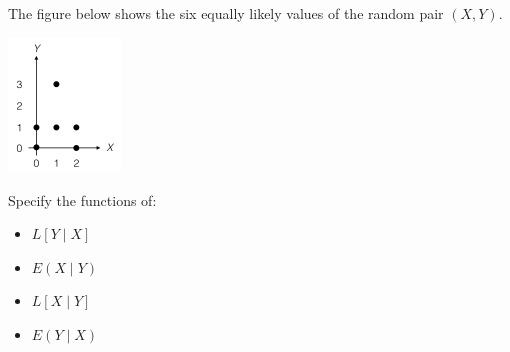 \question The figure below shows the six equally likely values of the 
random pair $(X, Y)$. 

\begin{center}
    \includegraphics[width=3cm]{find_from_graph.jpg}
\end{center}

Specify the functions of:
\begin{itemize}
    \item $L[Y\mid X]$
    \item $E(X\mid Y)$
    \item $L[X\mid Y]$
    \item $E(Y\mid X)$
\end{itemize}

